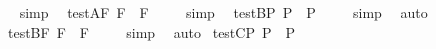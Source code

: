 \begin{isabellebody}
\isadelimproof
\ %
\endisadelimproof
%
\isatagproof
{}\isamarkupfalse%
\ simp\ \isamarkupfalse%
%
\endisatagproof
{\isafoldproof}%
%
\isadelimproof
%
\endisadelimproof
\isanewline
{}\isamarkupfalse%
\ test{\isacharunderscore}A{\isacharunderscore}F{\isacharcolon}\ {\isachardoublequoteopen}{\isacharbrackleft}\isactrlbold {\isasymbox}{\isacharparenleft}\isactrlbold {\isasymdiamond}{\isacharparenleft}{\isasymphi}\isactrlsup F{\isacharparenright}{\isacharparenright}\ \isactrlbold {\isasymrightarrow}\ \isactrlbold {\isasymdiamond}{\isacharparenleft}{\isasymphi}\isactrlsup F{\isacharparenright}{\isacharbrackright}\ {\isacharequal}\ {\isasymtop}{\isachardoublequoteclose}%
\isadelimproof
\ %
\endisadelimproof
%
\isatagproof
{}\isamarkupfalse%
\ simp\ \isamarkupfalse%
%
\endisatagproof
{\isafoldproof}%
%
\isadelimproof
%
\endisadelimproof
\isanewline
\isanewline
{}\isamarkupfalse%
\ test{\isacharunderscore}B{\isacharunderscore}P{\isacharcolon}\ {\isachardoublequoteopen}{\isacharbrackleft}\isactrlbold {\isasymdiamond}{\isacharparenleft}\isactrlbold {\isasymbox}{\isacharparenleft}{\isasymphi}\isactrlsup P{\isacharparenright}{\isacharparenright}\ \isactrlbold {\isasymrightarrow}\ \isactrlbold {\isasymdiamond}{\isacharparenleft}{\isasymphi}\isactrlsup P{\isacharparenright}{\isacharbrackright}\ {\isacharequal}\ {\isasymtop}{\isachardoublequoteclose}%
\isadelimproof
\ %
\endisadelimproof
%
\isatagproof
{}\isamarkupfalse%
\ simp\ \isamarkupfalse%
\ auto%
\endisatagproof
{\isafoldproof}%
%
\isadelimproof
%
\endisadelimproof
\isanewline
{}\isamarkupfalse%
\ test{\isacharunderscore}B{\isacharunderscore}F{\isacharcolon}\ {\isachardoublequoteopen}{\isacharbrackleft}\isactrlbold {\isasymdiamond}{\isacharparenleft}\isactrlbold {\isasymbox}{\isacharparenleft}{\isasymphi}\isactrlsup F{\isacharparenright}{\isacharparenright}\ \isactrlbold {\isasymrightarrow}\ \isactrlbold {\isasymdiamond}{\isacharparenleft}{\isasymphi}\isactrlsup F{\isacharparenright}{\isacharbrackright}\ {\isacharequal}\ {\isasymtop}{\isachardoublequoteclose}%
\isadelimproof
\ %
\endisadelimproof
%
\isatagproof
{}\isamarkupfalse%
\ simp\ \isamarkupfalse%
\ auto%
\endisatagproof
{\isafoldproof}%
%
\isadelimproof
%
\endisadelimproof
\isanewline
\isanewline
{}\isamarkupfalse%
\ test{\isacharunderscore}C{\isacharunderscore}P{\isacharcolon}\ {\isachardoublequoteopen}{\isacharbrackleft}\isactrlbold {\isasymbox}{\isacharparenleft}\isactrlbold {\isasymdiamond}{\isacharparenleft}{\isasymphi}\isactrlsup P{\isacharparenright}{\isacharparenright}\ \isactrlbold {\isasymrightarrow}\ \isactrlbold {\isasymbox}{\isacharparenleft}{\isasymphi}\isactrlsup P{\isacharparenright}{\isacharbrackright}\ {\isacharequal}\ {\isasymtop}{\isachardoublequoteclose}%

\end{isabellebody}
